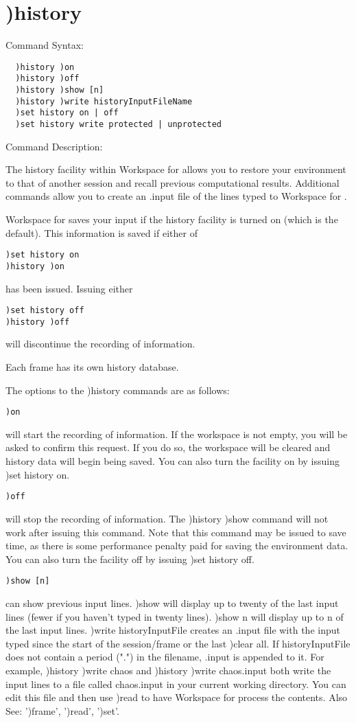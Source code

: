 \section{)history}

Command Syntax:
\begin{verbatim}
  )history )on
  )history )off
  )history )show [n]
  )history )write historyInputFileName
  )set history on | off
  )set history write protected | unprotected
\end{verbatim}
Command Description:

The history facility within Workspace for \nr{} allows you to restore your environment to that of another session and recall previous computational results. Additional commands allow you to create an .input file of the lines typed to Workspace for \nr{}.

Workspace for \nr{} saves your input if the history facility is turned on (which is the default). This information is saved if either of
\begin{verbatim}
)set history on
)history )on
\end{verbatim}
has been issued. Issuing either
\begin{verbatim}
)set history off
)history )off
\end{verbatim}
will discontinue the recording of information.

Each frame has its own history database.

The options to the )history commands are as follows:
\begin{verbatim}
)on
\end{verbatim}
will start the recording of information. If the workspace is not empty, you will be asked to confirm this request. If you do so, the workspace will be cleared and history data will begin being saved. You can also turn the facility on by issuing )set history on.
\begin{verbatim}
)off
\end{verbatim}
will stop the recording of information. The )history )show command will not work after issuing this command. Note that this command may be issued to save time, as there is some performance penalty paid for saving the environment data. You can also turn the facility off by issuing )set history off.
\begin{verbatim}
)show [n]
\end{verbatim}
can show previous input lines. )show will display up to twenty of the last input lines (fewer if you haven't typed in twenty lines). )show n will display up to n of the last input lines.
)write historyInputFile
creates an .input file with the input typed since the start of the session/frame or the last )clear all. If historyInputFile does not contain a period (".") in the filename, .input is appended to it. For example, )history )write chaos and )history )write chaos.input both write the input lines to a file called chaos.input in your current working directory. You can edit this file and then use )read to have Workspace for \nr{} process the contents.
Also See: ')frame', ')read', ')set'.

